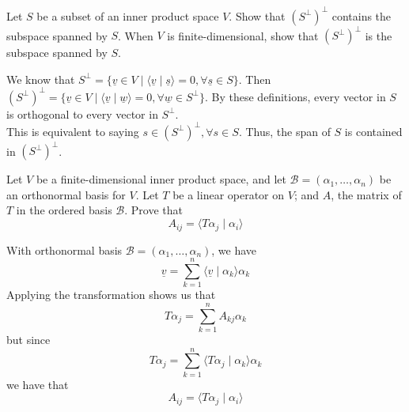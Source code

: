 \documentclass[11pt]{article}
\renewcommand{\vec}[1]{\underline{#1}}
\begin{document}
\pagebreak

\begin{homeworkProblem}

    Let $S$ be a subset of an inner product space $V$. Show that $(S^\perp)^\perp$ contains the subspace
    spanned by $S$. When $V$ is finite-dimensional, show that $(S^\perp)^\perp$ is the subspace spanned by $S$. \\

    \solution

    We know that $S^\perp = \{\vec{v} \in V \mid \langle \vec{v} \mid \vec{s} \rangle = 0, \forall \vec{s} \in S\}$. Then $(S^\perp)^\perp = \{\vec{v} \in V \mid \langle \vec{v} \mid \vec{w} \rangle = 0, \forall \vec{w} \in S^\perp\}$.
    By these definitions, every vector in $S$ is orthogonal to every vector in $S^\perp$. \\

    This is equivalent to saying $s \in (S^\perp)^\perp, \forall s \in S$. Thus, the span of $S$ is contained in $(S^\perp)^\perp$. \\

\end{homeworkProblem}

\pagebreak

\begin{homeworkProblem}

    Let $V$ be a finite-dimensional inner product space, and let $\mathcal{B} = (\alpha_1, \ldots, \alpha_n)$ be an orthonormal
    basis for $V$. Let $T$ be a linear operator on $V$; and $A$, the matrix of $T$ in the ordered basis $\mathcal{B}$.
    Prove that
    \[
        A_{ij} = \langle T \alpha_j \mid \alpha_i \rangle
    \]

    \solution

    With orthonormal basis $\mathcal{B} = (\alpha_1, \ldots, \alpha_n)$, we have
    \[
        \vec{v} = \sum_{k=1}^n \langle \vec{v} \mid \alpha_k \rangle \alpha_k
    \]
    Applying the transformation shows us that
    \[
        T \alpha_j = \sum_{k=1}^n A_{kj} \alpha_k
    \]
    but since
    \[
        T \alpha_j = \sum_{k=1}^n \langle T \alpha_j \mid \alpha_k \rangle \alpha_k
    \]
    we have that
    \[
        A_{ij} = \langle T \alpha_j \mid \alpha_i \rangle
    \]

\end{homeworkProblem}

\pagebreak
\end{document}
